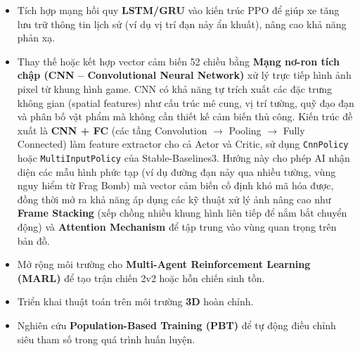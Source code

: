 \documentclass[a4paper, 12pt]{report}
\begin{document}
  \begin{itemize}
    \item Tích hợp mạng hồi quy \textbf{LSTM/GRU} vào kiến trúc PPO để giúp xe tăng lưu trữ thông tin lịch sử (ví dụ vị trí đạn nảy ẩn khuất), nâng cao khả năng phản xạ.
    \item Thay thế hoặc kết hợp vector cảm biến 52 chiều bằng \textbf{Mạng nơ-ron tích chập (CNN -- Convolutional Neural Network)} xử lý trực tiếp hình ảnh pixel từ khung hình game. CNN có khả năng tự trích xuất các đặc trưng không gian (spatial features) như cấu trúc mê cung, vị trí tường, quỹ đạo đạn và phân bố vật phẩm mà không cần thiết kế cảm biến thủ công. Kiến trúc đề xuất là \textbf{CNN + FC} (các tầng Convolution $\to$ Pooling $\to$ Fully Connected) làm feature extractor cho cả Actor và Critic, sử dụng \texttt{CnnPolicy} hoặc \texttt{MultiInputPolicy} của Stable-Baselines3. Hướng này cho phép AI nhận diện các mẫu hình phức tạp (ví dụ đường đạn nảy qua nhiều tường, vùng nguy hiểm từ Frag Bomb) mà vector cảm biến cố định khó mã hóa được, đồng thời mở ra khả năng áp dụng các kỹ thuật xử lý ảnh nâng cao như \textbf{Frame Stacking} (xếp chồng nhiều khung hình liên tiếp để nắm bắt chuyển động) và \textbf{Attention Mechanism} để tập trung vào vùng quan trọng trên bản đồ.
    \item Mở rộng môi trường cho \textbf{Multi-Agent Reinforcement Learning (MARL)} để tạo trận chiến 2v2 hoặc hỗn chiến sinh tồn.
    \item Triển khai thuật toán trên môi trường \textbf{3D} hoàn chỉnh.
    \item Nghiên cứu \textbf{Population-Based Training (PBT)} để tự động điều chỉnh siêu tham số trong quá trình huấn luyện.
  \end{itemize}
\end{document}
